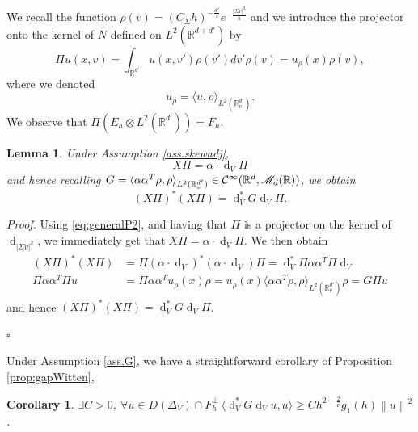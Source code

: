 \documentclass[12pt]{amsart}
\newcommand{\R}{\mathbb R}
\def\<{\langle}
\def\>{\rangle}
\newcommand{\bp}{{\it Proof. }}
\newcommand{\ep}{\hfill $\square$}
\renewcommand{\d}{\operatorname{d}}
\numberwithin{equation}{section}
\numberwithin{figure}{section}
\newcommand{\vvert}[1]{\left\lVert#1\right\rVert}
\newtheorem{corollary}[defin]{Corollary}
\newtheorem{lemma}[defin]{Lemma}
\def\Mr{{\mathscr M}}\def\Nr{{\mathscr N}}\def\Or{{\mathscr O}}\def\Pr{{\mathscr P}}
\begin{document}
We recall the function $\rho(v)=(C_\Sigma h)^{-\frac {d'}4}e^{-\frac{|\Sigma v|^2}{h}}$ and we introduce the projector onto the kernel of $N$ defined on $L^2(\R^{d+d'})$ by
\begin{equation*}
\Pi u(x,v)=\int_{\R^{d'}}u(x,v')\rho(v')dv' \rho(v)=u_\rho(x)\rho(v),
\end{equation*}
where we denoted
\begin{equation}\label{eq:rho}
u_\rho = \< u, \rho\>_{L^2(\R_v^{d'})}.
\end{equation}
We observe that $\Pi (E_h\otimes L^2(\R^{d'})) = F_h$.

\begin{lemma}\label{lem:XPi}
    Under Assumption \ref{ass.skewadj},
    \begin{equation}\label{eq:XPi}
    X\Pi = \alpha\cdot\d_V\Pi
    \end{equation}
    and hence recalling $G = \<\alpha\alpha^T\rho,\rho\>_{L^2(\R_v^{d'})} \in \ccc^\infty(\R^d,\Mr_d(\R))$, we obtain
    \begin{equation}\label{eq:XPistarXPi}
    (X\Pi)^*(X\Pi) = \d_V^*G\d_V\Pi.
    \end{equation}
\end{lemma}

\bp Using \eqref{eq:generalP2}, and having that $\Pi$ is a projector on the kernel of $\d_{|\Sigma v|^2}$, we immediately get that $X\Pi = \alpha\cdot\d_V\Pi$. We then obtain
\begin{equation*}
\begin{aligned}
    (X\Pi)^*(X\Pi) &= \Pi(\alpha\cdot\d_V)^*(\alpha\cdot\d_V)\Pi = \d_V^*\Pi\alpha\alpha^T\Pi\d_V\\
    \Pi\alpha\alpha^T\Pi u &= \Pi\alpha\alpha^Tu_\rho(x)\rho = u_\rho(x)\<\alpha\alpha^T\rho,\rho\>_{L^2(\R_v^{d'})}\rho = G\Pi u
\end{aligned}
\end{equation*}
and hence $(X\Pi)^*(X\Pi) = \d_V^*G\d_V\Pi$.

\ep

Under Assumption \ref{ass.G}, we have a straightforward corollary of Proposition \ref{prop:gapWitten},

\begin{corollary}\label{cor:lowbound}
    $\exists C>0,\ \forall u\in D(\Delta_V)\cap F_h^\bot\ \<\d_V^*G\d_Vu,u\> \geq Ch^{2-\frac2{\overline{\nu}}}g_1(h)\vvert{u}^2$.
\end{corollary}
\end{document}
